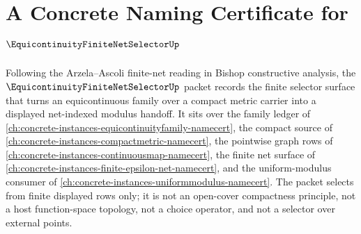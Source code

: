 \chapter{A Concrete Naming Certificate for $\EquicontinuityFiniteNetSelectorUp$}
\label{ch:concrete-instances-equicontinuity-finite-net-selector-namecert}

Following the Arzela--Ascoli finite-net reading in Bishop constructive analysis, the $\EquicontinuityFiniteNetSelectorUp$ packet records the finite selector surface that turns an equicontinuous family over a compact metric carrier into a displayed net-indexed modulus handoff. It sits over the family ledger of \autoref{ch:concrete-instances-equicontinuityfamily-namecert}, the compact source of \autoref{ch:concrete-instances-compactmetric-namecert}, the pointwise graph rows of \autoref{ch:concrete-instances-continuousmap-namecert}, the finite net surface of \autoref{ch:concrete-instances-finite-epsilon-net-namecert}, and the uniform-modulus consumer of \autoref{ch:concrete-instances-uniformmodulus-namecert}. The packet selects from finite displayed rows only; it is not an open-cover compactness principle, not a host function-space topology, not a choice operator, and not a selector over external points.

